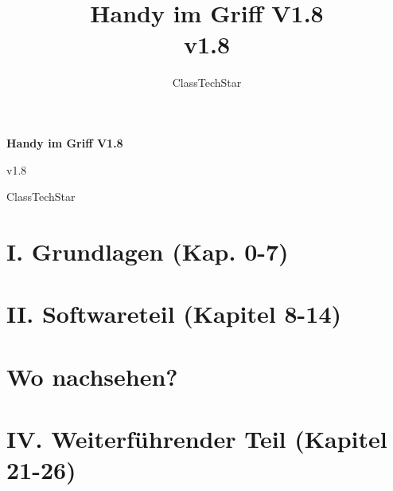 \documentclass[11pt,a4paper,openany]{book}
\title{Handy im Griff V1.8\\ \large v1.8}
\author{ClassTechStar}
\date{}
\begin{document}
\begin{titlepage}
\centering
\vspace*{0.28\textheight}
{\Huge\bfseries Handy im Griff V1.8\par}
\vspace{1.2em}
{\Large v1.8\par}
\vfill
{\large ClassTechStar\par}
\end{titlepage}
\frontmatter
\tableofcontents
\mainmatter
\part*{I. Grundlagen (Kap. 0-7)}










\part*{II. Softwareteil (Kapitel 8-14)}








\part*{Wo nachsehen?}







\part*{IV. Weiterführender Teil (Kapitel 21-26)}







\end{document}
